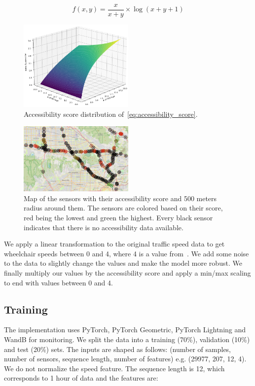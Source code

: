 \begin{equation}
    f(x, y) = \frac{x}{x + y} \times \log(x + y + 1)\label{eq:accessibility_score}
\end{equation}
\vspace{1em}

\begin{figure}[htbp]
    \centering
    \includegraphics[width=0.5\textwidth]{resources/accessibility_score_function}
    \caption{Accessibility score distribution of~\eqref{eq:accessibility_score}.}
    \label{fig:accessibility_score_function}
\end{figure}

\begin{figure}[htbp]
    \centering
    \includegraphics[width=0.5\textwidth]{resources/map}
    \caption{
        Map of the sensors with their accessibility score and 500 meters radius around them.
        The sensors are colored based on their score, red being the lowest and green the highest.
        Every black sensor indicates that there is no accessibility data available.
    }
    \label{fig:map}
\end{figure}

We apply a linear transformation to the original traffic speed data to get wheelchair speeds between 0 and 4, where 4 is a value from~\cite{FreedomMobility}.
We add some noise to the data to slightly change the values and make the model more robust.
We finally multiply our values by the accessibility score and apply a min/max scaling to end with values between 0 and 4.

\subsection{Training}\label{subsec:training}
The implementation uses PyTorch, PyTorch Geometric, PyTorch Lightning and WandB for monitoring.
We split the data into a training (70\%), validation (10\%) and test (20\%) sets.
The inputs are shaped as follows: (number of samples, number of sensors, sequence length, number of features) e.g. (29977, 207, 12, 4).
We do not normalize the speed feature.
The sequence length is 12, which corresponds to 1 hour of data and the features are:

